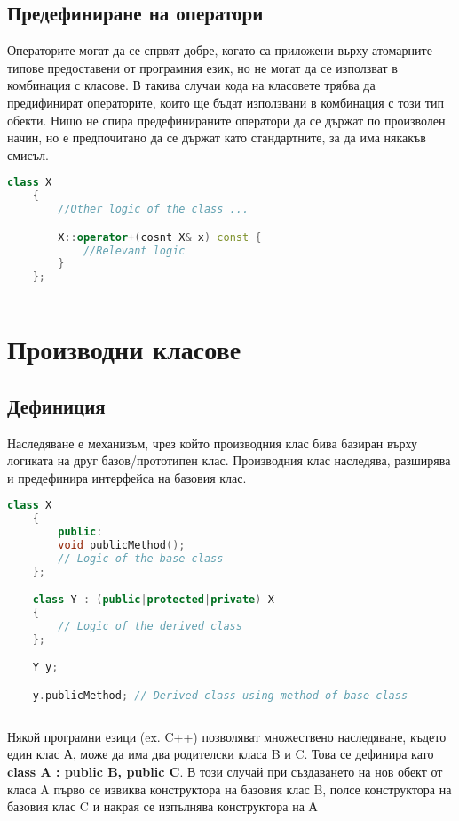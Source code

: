 \documentclass[fleqn,12pt]{article}
\begin{document}
\subsection{Предефиниране на оператори}
Операторите могат да се спрвят добре, когато са приложени върху атомарните типове предоставени от програмния език, но не могат да се използват в комбинация с класове. В такива случаи кода на класовете трябва да предифинират операторите, които ще бъдат използвани в комбинация с този тип обекти. Нищо не спира предефинираните оператори да се държат по произволен начин, но е предпочитано да се държат като стандартните, за да има някакъв смисъл.

\begin{lstlisting}[language=C++, caption=Example overriding of an operator]
    class X
    {
        //Other logic of the class ...

        X::operator+(cosnt X& x) const {
            //Relevant logic
        }
    };
    
\end{lstlisting}


\section{Производни класове}
\subsection{Дефиниция}
Наследяване е механизъм, чрез който производния клас бива базиран върху логиката на друг базов/прототипен клас. Производния клас наследява, разширява и предефинира интерфейса на базовия клас. 

\begin{lstlisting}[language=C++, caption=Example inheritence]
    class X
    {
        public:
        void publicMethod();
        // Logic of the base class
    };

    class Y : (public|protected|private) X
    {
        // Logic of the derived class
    };

    Y y;

    y.publicMethod; // Derived class using method of base class
    
\end{lstlisting}

Някой програмни езици (ex. C++) позволяват множествено наследяване, където един клас А, може да има два родителски класа B и C. Това се дефинира като \textbf{ class A : public B, public C}. В този случай при създаването на нов обект от класа A първо се извиква конструктора на базовия клас B, полсе конструктора на базовия клас C и накрая се изпълнява конструктора на А
\end{document}
